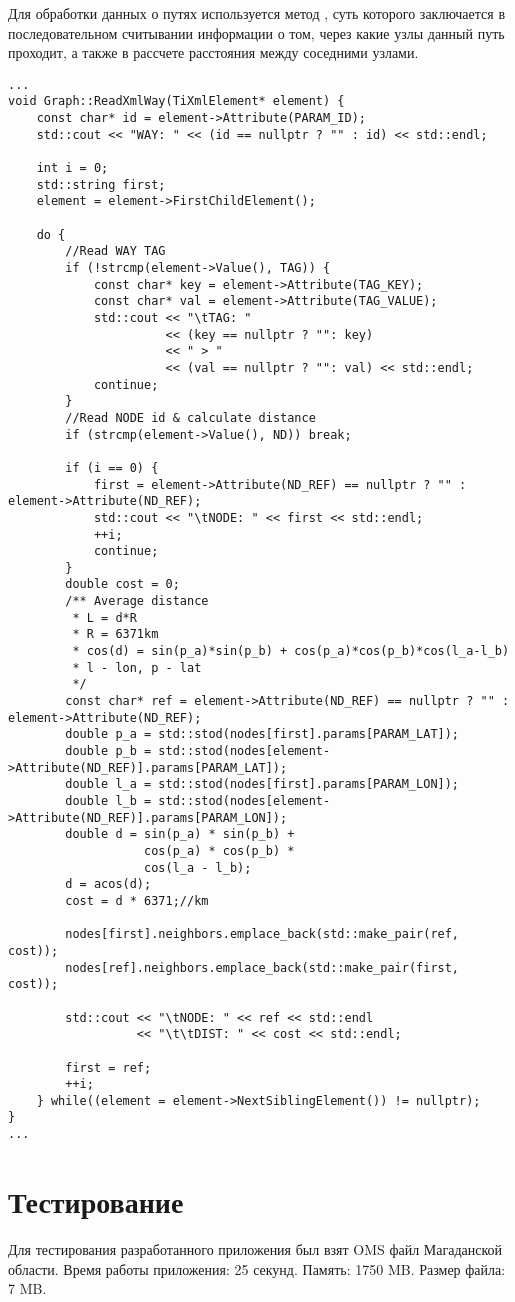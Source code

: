 \par Для обработки данных о путях используется метод , суть
которого заключается в последовательном считывании информации о том, через какие
узлы данный путь проходит, а также в рассчете расстояния между соседними узлами.
\begin{lstlisting}[caption=method ReadXmlNode (Graph.cpp), style=customcpp]
...
void Graph::ReadXmlWay(TiXmlElement* element) {
    const char* id = element->Attribute(PARAM_ID);
    std::cout << "WAY: " << (id == nullptr ? "" : id) << std::endl;

    int i = 0;
    std::string first;
    element = element->FirstChildElement();

    do {
        //Read WAY TAG
        if (!strcmp(element->Value(), TAG)) {
            const char* key = element->Attribute(TAG_KEY);
            const char* val = element->Attribute(TAG_VALUE);
            std::cout << "\tTAG: "
                      << (key == nullptr ? "": key)
                      << " > "
                      << (val == nullptr ? "": val) << std::endl;
            continue;
        }
        //Read NODE id & calculate distance
        if (strcmp(element->Value(), ND)) break;

        if (i == 0) {
            first = element->Attribute(ND_REF) == nullptr ? "" : element->Attribute(ND_REF);
            std::cout << "\tNODE: " << first << std::endl;
            ++i;
            continue;
        }
        double cost = 0;
        /** Average distance
         * L = d*R
         * R = 6371km
         * cos(d) = sin(p_a)*sin(p_b) + cos(p_a)*cos(p_b)*cos(l_a-l_b)
         * l - lon, p - lat
         */
        const char* ref = element->Attribute(ND_REF) == nullptr ? "" : element->Attribute(ND_REF);
        double p_a = std::stod(nodes[first].params[PARAM_LAT]);
        double p_b = std::stod(nodes[element->Attribute(ND_REF)].params[PARAM_LAT]);
        double l_a = std::stod(nodes[first].params[PARAM_LON]);
        double l_b = std::stod(nodes[element->Attribute(ND_REF)].params[PARAM_LON]);
        double d = sin(p_a) * sin(p_b) +
                   cos(p_a) * cos(p_b) *
                   cos(l_a - l_b);
        d = acos(d);
        cost = d * 6371;//km

        nodes[first].neighbors.emplace_back(std::make_pair(ref, cost));
        nodes[ref].neighbors.emplace_back(std::make_pair(first, cost));

        std::cout << "\tNODE: " << ref << std::endl
                  << "\t\tDIST: " << cost << std::endl;

        first = ref;
        ++i;
    } while((element = element->NextSiblingElement()) != nullptr);
}
...
\end{lstlisting}

\chapter{Тестирование}
\noindent\indent Для тестирования разработанного приложения был взят OMS файл Магаданской области.
Время работы приложения: 25 секунд.
Память: 1750 MB.
Размер файла: 7 MB.
